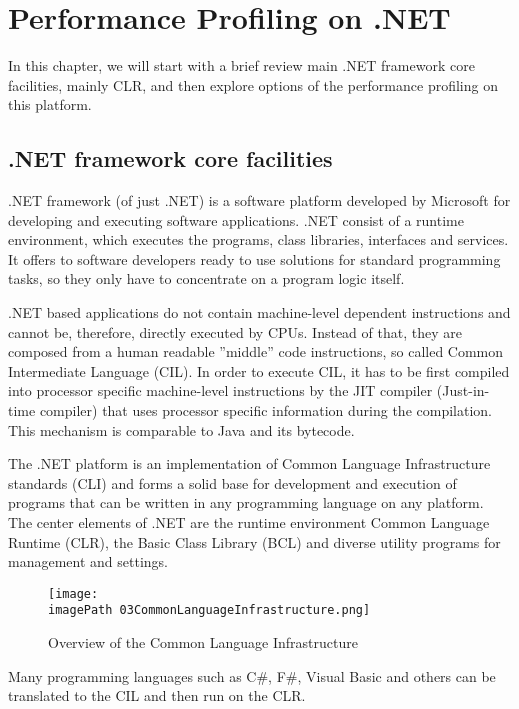 
\chapter{Performance Profiling on .NET}
\label{chapPerProfOnDotNet}

In this chapter, we will start with a brief review main .NET framework core facilities, mainly CLR, and then explore options of the performance profiling on this platform. 

\section{.NET framework core facilities}
.NET framework (of just .NET) is a software platform developed by Microsoft for developing and executing software applications. .NET  consist of a runtime environment, which executes the programs, class libraries, interfaces and services. It offers to software developers ready to use solutions for standard programming tasks, so they only have to concentrate on a program logic itself.

.NET based applications do not contain machine-level dependent instructions and cannot be, therefore, directly executed by CPUs. Instead of that, they are composed from a human readable ''middle'' code instructions, so called Common Intermediate Language (CIL). In order to execute CIL, it has to be first compiled into processor specific machine-level instructions by the JIT compiler (Just-in-time compiler) that uses processor specific information during the compilation. This mechanism is comparable to Java and its bytecode.

The .NET platform is an implementation of Common Language Infrastructure standards (CLI) and forms a solid base for development and execution of programs that can be written in any programming language on any platform. The center elements of .NET are the runtime environment Common Language Runtime (CLR), the Basic Class Library (BCL) and diverse utility programs for management and settings.

\begin{figure}
	\centering
		\texttt{[image: \\imagePath 03CommonLanguageInfrastructure.png]}
		\caption{Overview of the Common Language Infrastructure \cite{OCLI} }
	\label{fig:03CommonLanguageInfrastructure}
\end{figure}

Many programming languages such as C\#, F\#, Visual Basic and others can be translated to the CIL and then run on the CLR. 


